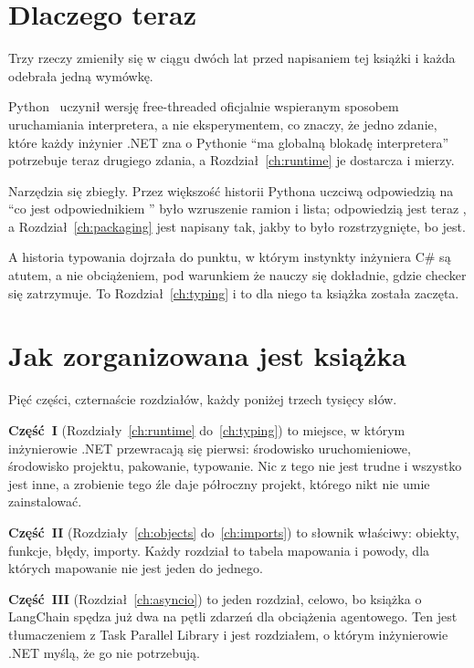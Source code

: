 
\section*{Dlaczego teraz}

Trzy rzeczy zmieniły się w ciągu dwóch lat przed napisaniem tej książki i
każda odebrała jedną wymówkę.

Python~\pyver{} uczynił wersję free-threaded oficjalnie wspieranym sposobem
uruchamiania interpretera, a nie eksperymentem, co znaczy, że jedno zdanie,
które każdy inżynier .NET zna o Pythonie \dash{} \enquote{ma globalną blokadę
interpretera} \dash{} potrzebuje teraz drugiego zdania, a
Rozdział~\ref{ch:runtime} je dostarcza i mierzy.

Narzędzia się zbiegły. Przez większość historii Pythona uczciwą odpowiedzią na
\enquote{co jest odpowiednikiem } było wzruszenie ramion i
lista; odpowiedzią jest teraz , a Rozdział~\ref{ch:packaging} jest
napisany tak, jakby to było rozstrzygnięte, bo jest.

A historia typowania dojrzała do punktu, w którym instynkty inżyniera C\# są
atutem, a nie obciążeniem, pod warunkiem że nauczy się dokładnie, gdzie
checker się zatrzymuje. To Rozdział~\ref{ch:typing} i to dla niego ta książka
została zaczęta.

\section*{Jak zorganizowana jest książka}

Pięć części, czternaście rozdziałów, każdy poniżej trzech tysięcy słów.

\textbf{Część~I \dash{} \lblPartI} (Rozdziały~\ref{ch:runtime}
do~\ref{ch:typing}) to miejsce, w którym inżynierowie .NET przewracają się
pierwsi: środowisko uruchomieniowe, środowisko projektu, pakowanie, typowanie.
Nic z tego nie jest trudne i wszystko jest inne, a zrobienie tego źle daje
półroczny projekt, którego nikt nie umie zainstalować.

\textbf{Część~II \dash{} \lblPartII} (Rozdziały~\ref{ch:objects}
do~\ref{ch:imports}) to słownik właściwy: obiekty, funkcje, błędy, importy.
Każdy rozdział to tabela mapowania i powody, dla których mapowanie nie jest
jeden do jednego.

\textbf{Część~III \dash{} \lblPartIII} (Rozdział~\ref{ch:asyncio}) to jeden
rozdział, celowo, bo książka o LangChain spędza już dwa na pętli zdarzeń dla
obciążenia agentowego. Ten jest tłumaczeniem z Task Parallel Library i jest
rozdziałem, o którym inżynierowie .NET myślą, że go nie potrzebują.

